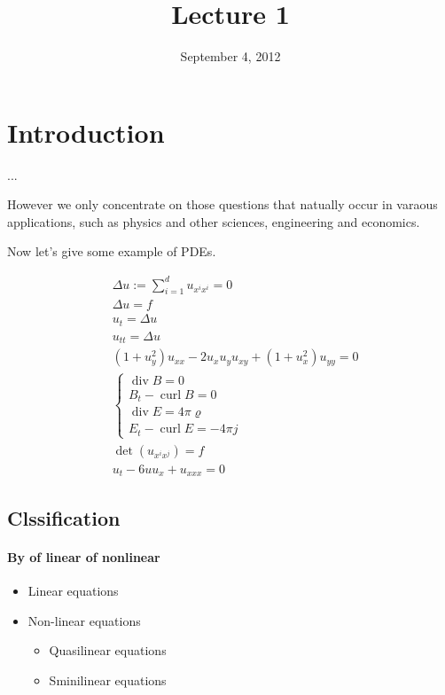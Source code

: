 \documentclass{simplenotes}
\date{September 4, 2012}
\title{Lecture 1}
\DeclareMathOperator{\Curl}{curl}
\DeclareMathOperator{\Div}{div}
\renewcommand{\rho}{\varrho}
\begin{document}
\maketitle

\section{Introduction}

\begin{definition}
...
\end{definition}

However we only concentrate on those questions that natually occur in varaous applications, such as physics and other sciences, engineering and economics.

Now let's give some example of PDEs.

\begin{example}
\begin{align}
&\Delta u:= \sum_{i=1}^d u_{x^ix^i} =0 \tag{Laplace Equation}\\
&\Delta u =f \tag{Poisson Equation}\\
&u_t =\Delta u \tag{Heat Equation}\\
&u_{tt} =\Delta u \tag{Wave Equation}\\
&(1+u_y^2)u_{xx}-2u_xu_yu_{xy}+(1+u_x^2)u_{yy}=0 \tag{Minimal Surface Equation}\\
&\begin{cases}
\Div B =0\\
B_t - \Curl B =0\\
\Div E = 4\pi\rho\\
E_t-\Curl E= -4\pi j
\end{cases}\tag{Maxwell Equations}\\
&\det(u_{x^ix^j})=f \tag{Monge-Ampere Equation}\\
&u_t-6uu_x+u_{xxx}=0 \tag{Koreweg-de Vires Equation}
\end{align}
\end{example}

\subsection{Clssification}
\paragraph{By of linear of nonlinear}

\begin{itemize}[nosep]
\item Linear equations
\item Non-linear equations
\begin{itemize}[nosep]
\item
Quasilinear equations
\item
Sminilinear equations
\end{itemize}
\end{itemize}
\end{document}
